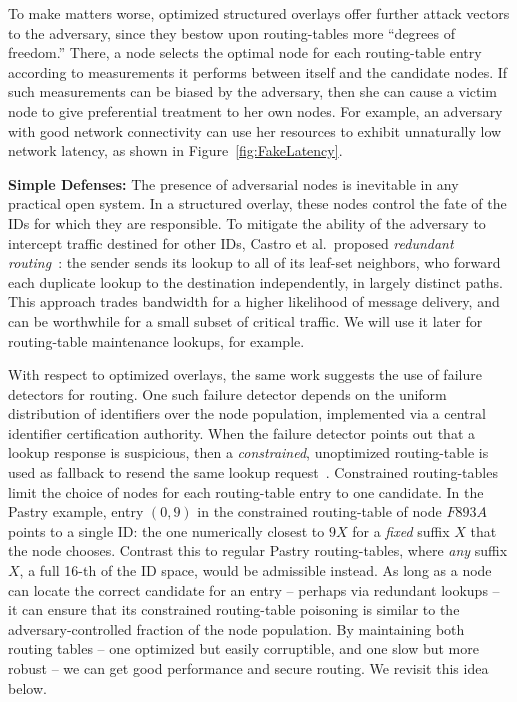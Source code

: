 \documentclass[10pt,twocolumn]{article}
\renewcommand{\paragraph}[1]{\textbf{#1:}}
\begin{document}
To make matters worse, optimized structured overlays offer further attack
vectors to the adversary, since they bestow upon routing-tables  more
``degrees of freedom.''  There, a node selects the
optimal node for each routing-table entry according to measurements it
performs between itself and the candidate nodes.  If
such measurements can be biased by the adversary, then she can cause a
victim node to give preferential treatment to her own nodes.  For example,
an adversary with good network connectivity can use her
resources to exhibit unnaturally low
network latency, as shown in
Figure~\ref{fig:FakeLatency}.

\paragraph{Simple Defenses} The presence of
adversarial nodes is inevitable in any practical open system.  In a
structured overlay, these nodes control the fate of the IDs for which they are
responsible.  To mitigate the ability of the adversary to intercept
traffic destined for other IDs, Castro et al.\ proposed \emph{redundant routing}~\cite{Castro2002}:
the sender sends its lookup to all of its leaf-set neighbors, who 
forward each duplicate lookup to the destination independently, in largely
distinct paths. This approach trades bandwidth for a higher likelihood of 
message delivery, and can be worthwhile for a small subset of critical traffic. 
We will use it later for routing-table maintenance lookups, for example.

With respect to optimized overlays,
the same work suggests the use of
failure detectors for routing.  One such failure detector depends on the
uniform distribution of identifiers over the node population,
implemented via a central identifier certification authority.  When the
failure detector points out that a lookup response is suspicious, then a
\emph{constrained}, unoptimized routing-table is used as fallback to resend
the same lookup request~\cite{Castro2002}.  Constrained routing-tables
limit the choice of nodes for each routing-table entry to one candidate.
In the Pastry example, entry $(0,9)$ in the constrained routing-table of
node $F893A$ points to a single ID: the one numerically
closest to $9X$ for a \emph{fixed} suffix $X$ that the node chooses.  Contrast
this to regular Pastry routing-tables, where \emph{any} suffix $X$, a full
16-th of the ID space, would be admissible instead.  As long as a
node can locate the correct candidate for an 
entry -- perhaps via redundant lookups -- it can ensure that its
constrained routing-table poisoning is similar to the
adversary-controlled fraction of the node population.
By maintaining both routing
tables -- one optimized but easily corruptible, and one slow but more
robust -- we can get
good performance and secure routing.  We revisit this idea
below.
\end{document}

